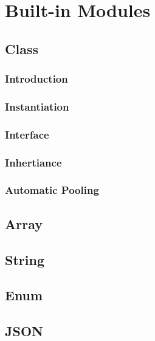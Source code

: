 \documentclass[12pt,letterpaper]{report}
\begin{document}
\chapter{Built-in Modules}
\section{Class}
\subsection{Introduction}
\subsection{Instantiation}
\subsection{Interface}
\subsection{Inhertiance}
\subsection{Automatic Pooling}
\section{Array}
\section{String}
\section{Enum}
\section{JSON}
\end{document}
